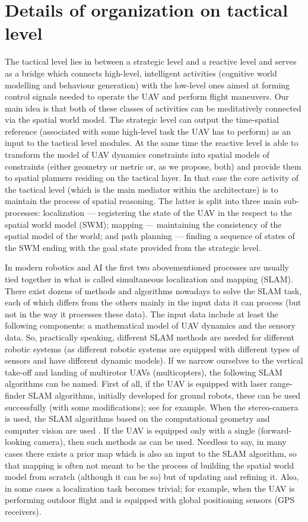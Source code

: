 \documentclass[review]{elsarticle}
\begin{document}
\section{Details of organization on tactical level}\label{sec:tactical}
The tactical level lies in between a strategic level and a reactive level and serves as a bridge which connects high-level, intelligent activities (cognitive world modelling and behaviour generation) with the low-level ones aimed at forming control signals needed to operate the UAV and perform flight maneuvers. Our main idea is that both of these classes of activities can be meditatively connected via the spatial world model. The strategic level can output the time-spatial reference (associated with some high-level task the UAV has to perform) as an input to the tactical level modules. At the same time the reactive level is able to transform the model of UAV dynamics constraints into spatial models of constraints (either geometry or metric or, as we propose, both) and provide them to spatial planners residing on the tactical layer. In that case the core activity of the tactical level (which is the main mediator within the architecture) is to maintain the process of spatial reasoning. The latter is split into three main sub-processes: localization --- registering the state of the UAV in the respect to the spatial world model (SWM); mapping --- maintaining the consistency of the spatial model of the world; and path planning --- finding a sequence of states of the SWM ending with the goal state provided from the strategic level.

In modern robotics and AI the first two abovementioned processes are usually tied together in what is called simultaneous localization and mapping (SLAM). There exist dozens of methods and algorithms nowadays to solve the SLAM task, each of which differs from the others mainly in the input data it can process (but not in the way it processes these data). The input data include at least the following components: a mathematical model of UAV dynamics and the sensory data. So, practically speaking, different SLAM methods are needed for different robotic systems (as different robotic systems are equipped with different types of sensors and have different dynamic models). If we narrow ourselves to the vertical take-off and landing of multirotor UAVs (multicopters), the following SLAM algorithms can be named. First of all, if the UAV is equipped with laser range-finder SLAM algorithms, initially developed for ground robots, these can be used successfully (with some modifications); see \cite{Borrmann2008} for example. When the stereo-camera is used, the SLAM algorithms based on the computational geometry and computer vision are used \cite{Sim2005}. If the UAV is equipped only with a single (forward-looking camera), then such methods as \cite{Saxena2007,Bills2011} can be used. Needless to say, in many cases there exists a prior map which is also an input to the SLAM algorithm, so that mapping is often not meant to be the process of building the spatial world model from scratch (although it can be so) but of updating and refining it. Also, in some cases a localization task becomes trivial; for example, when the UAV is performing outdoor flight and is equipped with global positioning sensors (GPS receivers).
\end{document}
